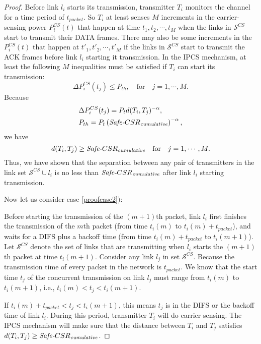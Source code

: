 \documentclass[conference]{IEEEtran}
\begin{document}
\begin{proof}
Before link $l_i$ starts its transmission, transmitter $T_i$
monitors the channel for a time period of $t_{packet}$. So $T_i$ at
least senses $M$ increments in the carrier-sensing power
$P_{i}^{CS}(t)$ that happen at time $t_1,t_2,\cdots,t_M$ when the
links in $\mathcal{S}^{ CS}$ start to transmit their DATA frames.
There may also be some increments in the $P_{i}^{CS}(t)$ that happen
at $t'_1,t'_2,\cdots,t'_M$ if the links in $\mathcal{S}^{ CS}$ start
to transmit the ACK frames before link $l_i$ starting it
transmission. In the IPCS mechanism, at least the following $M$
inequalities must be satisf\/ied if $T_i$ can start its
transmission:
\begin{equation}
\Delta P_{i}^{CS} (t_j ) \le P_{th}, \quad \text{for} \quad
j=1,\cdots,M. \nonumber
\end{equation}
Because
\begin{align}
&\Delta P_{i}^{CS} (t_j )=P_td(T_i,T_j)^{-\alpha}, \nonumber\\
&P_{th}=P_t\left(\text{\emph{Safe-}}CSR_\text{\emph{cumulative}}\right)^{-\alpha},\nonumber
\end{align}
we have
\begin{equation}
d(T_i,T_j)\geq \text{\emph{Safe-}}CSR_\text{\emph{cumulative}} \quad
\text{for} \quad j=1,\cdots,M. \nonumber
\end{equation}
Thus, we have shown that the separation between any pair of
transmitters in the link set $\mathcal{S}^{ CS}\cup l_i$ is no less
than $\text{\emph{Safe-}}CSR_\text{\emph{cumulative}}$ after link
$l_i$ starting transmission.



Now let us consider case \ref{proofcase2}$)$:

Before starting the transmission of the $(m+1)$th packet, link $l_i$
f\/irst f\/inishes the transmission of the $m$th packet (from time
$t_i(m)$ to $t_i(m)+t_{packet}$), and waits for a DIFS plus a
backoff time (from time $t_i(m)+t_{packet}$ to $t_i(m+1)$). Let
$\mathcal{S}^{ CS}$ denote the set of links that are transmitting
when $l_i$ starts the $(m+1)$th packet at time $t_i(m+1)$. Consider
any link $l_j$ in set $\mathcal{S}^{ CS}$. Because the transmission
time of every packet in the network is $t_{packet}$. We know that
the start time $t_j$ of the concurrent transmission on link $l_j$
must range from $t_i(m)$ to $t_i(m+1)$, i.e., $t_i(m)<t_j<t_i(m+1)$.

If $t_i(m)+t_{packet}< t_j<t_i(m+1)$, this means $t_j$ is in the
DIFS or the backoff time of link $l_i$. During this period,
transmitter $T_i$ will do carrier sensing. The IPCS mechanism will
make sure that the distance between $T_i$ and $T_j$ satisf\/ies
$d(T_i,T_j)\geq \text{\emph{Safe-}}CSR_\text{\emph{cumulative}}$.


\end{proof}
\end{document}
